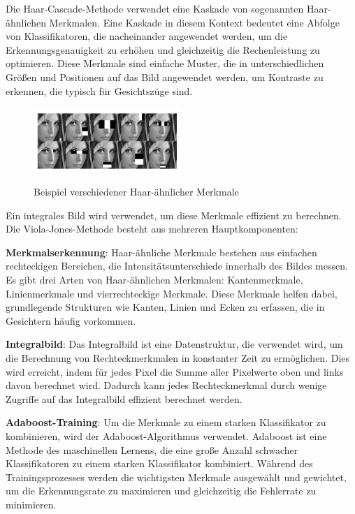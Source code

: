 Die Haar-Cascade-Methode verwendet eine Kaskade von sogenannten Haar-ähnlichen Merkmalen\cite{haar_quelle}. Eine Kaskade in diesem Kontext bedeutet eine Abfolge von Klassifikatoren, die nacheinander angewendet werden, um die Erkennungsgenauigkeit zu erhöhen und gleichzeitig die Rechenleistung zu optimieren. Diese Merkmale sind einfache Muster, die in unterschiedlichen Größen und Positionen auf das Bild angewendet werden, um Kontraste zu erkennen, die typisch für Gesichtszüge sind. 

\begin{figure}[h!]
    \centering
    \includegraphics[width=0.5\textwidth]{pictures/haarcascades.jpg}
    \caption{Beispiel verschiedener Haar-ähnlicher Merkmale}
    \label{fig:haar_cascade_example}
    \cite{haar_cascade_example}
\end{figure}

Ein integrales Bild wird verwendet, um diese Merkmale effizient zu berechnen. Die Viola-Jones-Methode besteht aus mehreren Hauptkomponenten:

\textbf{Merkmalserkennung}: Haar-ähnliche Merkmale bestehen aus einfachen rechteckigen Bereichen, die Intensitätsunterschiede innerhalb des Bildes messen. Es gibt drei Arten von Haar-ähnlichen Merkmalen: Kantenmerkmale, Linienmerkmale und vierrechteckige Merkmale. Diese Merkmale helfen dabei, grundlegende Strukturen wie Kanten, Linien und Ecken zu erfassen, die in Gesichtern häufig vorkommen.

\textbf{Integralbild}: Das Integralbild ist eine Datenstruktur, die verwendet wird, um die Berechnung von Rechteckmerkmalen in konstanter Zeit zu ermöglichen. Dies wird erreicht, indem für jedes Pixel die Summe aller Pixelwerte oben und links davon berechnet wird. Dadurch kann jedes Rechteckmerkmal durch wenige Zugriffe auf das Integralbild effizient berechnet werden.

\textbf{Adaboost-Training}: Um die Merkmale zu einem starken Klassifikator zu kombinieren, wird der Adaboost-Algorithmus verwendet. Adaboost ist eine Methode des maschinellen Lernens, die eine große Anzahl schwacher Klassifikatoren zu einem starken Klassifikator kombiniert. Während des Trainingsprozesses werden die wichtigsten Merkmale ausgewählt und gewichtet, um die Erkennungsrate zu maximieren und gleichzeitig die Fehlerrate zu minimieren.

